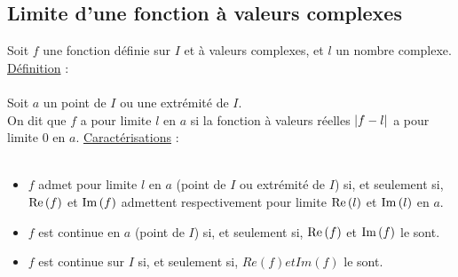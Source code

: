 \subsection{Limite d’une fonction à valeurs complexes}
\begin{defprop}
    Soit \(f\) une fonction définie sur \(I\) et à valeurs complexes, et \(l\) un nombre complexe.\\
    \underline{Définition} :\\~\\
    Soit \(a\) un point de \(I\) ou une extrémité de \(I\).\\
    On dit que \(f\) a pour limite \(l\) en \(a\) si la fonction à valeurs réelles \(\left\lvert f-l\right\rvert\) a pour limite \(0\) en \(a\).
    \underline{Caractérisations} :\\~\\
    \begin{itemize}
        \item \(f\) admet pour limite \(l\) en \(a\) (point de \(I\) ou extrémité de \(I\)) si, et seulement si, \(\operatorname{Re}\left(f\right)\) et \(\operatorname{Im}\left(f\right)\) admettent respectivement pour limite \(\operatorname{Re}\left(l\right)\) et \(\operatorname{Im}\left(l\right)\) en \(a\).
        \item \(f\) est continue en \(a\) (point de \(I\)) si, et seulement si,  \(\operatorname{Re}\left(f\right)\) et \(\operatorname{Im}\left(f\right)\) le sont.
        \item \(f\) est continue sur \(I\) si, et seulement si, \(Re(f ) et Im(f )\) le sont.
    \end{itemize}
            
\end{defprop}
